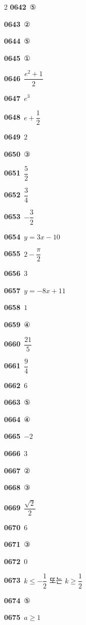 \documentclass[10pt,a4paper]{article}
\begin{document}
\begin{multicols}{2}
\noindent\textbf{0642}\ ⑤\par
\noindent\textbf{0643}\ ②\par
\noindent\textbf{0644}\ ⑤\par
\noindent\textbf{0645}\ ①\par
\noindent\textbf{0646}\ $\dfrac{e^2+1}{2}$\par
\noindent\textbf{0647}\ $e^3$\par
\noindent\textbf{0648}\ $e+\dfrac{1}{2}$\par
\noindent\textbf{0649}\ $2$\par
\noindent\textbf{0650}\ ③\par
\noindent\textbf{0651}\ $\dfrac{5}{2}$\par
\noindent\textbf{0652}\ $\dfrac{3}{4}$\par
\noindent\textbf{0653}\ $-\dfrac{3}{2}$\par
\noindent\textbf{0654}\ $y=3x-10$\par
\noindent\textbf{0655}\ $2-\dfrac{\pi}{2}$\par
\noindent\textbf{0656}\ $3$\par
\noindent\textbf{0657}\ $y=-8x+11$\par
\noindent\textbf{0658}\ $1$\par
\noindent\textbf{0659}\ ④\par
\noindent\textbf{0660}\ $\dfrac{21}{5}$\par
\noindent\textbf{0661}\ $\dfrac{9}{4}$\par
\noindent\textbf{0662}\ $6$\par
\noindent\textbf{0663}\ ⑤\par
\noindent\textbf{0664}\ ④\par
\noindent\textbf{0665}\ $-2$\par
\noindent\textbf{0666}\ $3$\par
\noindent\textbf{0667}\ ②\par
\noindent\textbf{0668}\ ③\par
\noindent\textbf{0669}\ $\dfrac{\sqrt{2}}{2}$\par
\noindent\textbf{0670}\ $6$\par
\noindent\textbf{0671}\ ③\par
\noindent\textbf{0672}\ $0$\par
\noindent\textbf{0673}\ $k\le-\dfrac{1}{2}$ 또는 $k\ge\dfrac{1}{2}$\par
\noindent\textbf{0674}\ ⑤\par
\noindent\textbf{0675}\ $a\ge 1$\par

\end{multicols}
\end{document}
